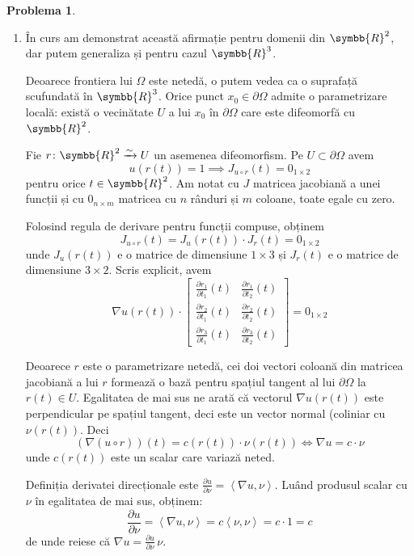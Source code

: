 \documentclass[a4paper, 12pt]{article}
\theoremstyle{definition}
\newtheorem{problem}{Problema}
\newcommand*{\reals}{\symbb{R}}
\newcommand*{\innerproduct}[2]{\left\langle #1, #2 \right\rangle}
\begin{document}
\begin{problem}
~
\begin{enumerate}[1).]
    \item În curs am demonstrat această afirmație pentru domenii din \(\reals^2\), dar putem generaliza și pentru cazul \(\reals^3\).

    Deoarece frontiera lui \(\Omega\) este netedă, o putem vedea ca o suprafață scufundată în \(\reals^3\). Orice punct \(x_0 \in \partial \Omega\) admite o parametrizare locală: există o vecinătate \(U\) a lui \(x_0\) în \(\partial \Omega\) care este difeomorfă cu \(\reals^2\).
    
    Fie \(r \colon \reals^{2} \xrightarrow{\sim} U\) un asemenea difeomorfism. Pe \(U \subset \partial \Omega\) avem
    \[
        u(r(t)) = 1 \implies J_{u \circ r} (t) = 0_{1 \times 2}
    \]
    pentru orice \(t \in \reals^2\). Am notat cu \(J\) matricea jacobiană a unei funcții și cu \(0_{n \times m}\) matricea cu \(n\) rânduri și \(m\) coloane, toate egale cu zero.
    
    Folosind regula de derivare pentru funcții compuse, obținem
    \[
         J_{u \circ r} (t) = J_{u} (r(t)) \cdot J_{r} (t) = 0_{1 \times 2}
    \]
    unde \(J_{u} (r(t))\) e o matrice de dimensiune \(1 \times 3\) și \(J_{r} (t)\) e o matrice de dimensiune \(3 \times 2\). Scris explicit, avem
    \[
        \nabla u(r(t))
        \cdot
        \begin{bmatrix}
            \frac{\partial r_1}{\partial t_1}(t) & \frac{\partial r_1}{\partial t_2}(t) \\[0.5em]
            \frac{\partial r_2}{\partial t_1}(t) & \frac{\partial r_2}{\partial t_2}(t) \\[0.5em]
            \frac{\partial r_3}{\partial t_1}(t) & \frac{\partial r_3}{\partial t_2}(t)
        \end{bmatrix} = 0_{1 \times 2}
    \]

    Deoarece \(r\) este o parametrizare netedă, cei doi vectori coloană din matricea jacobiană a lui \(r\) formează o bază pentru spațiul tangent al lui \(\partial \Omega\) la \(r(t) \in U\). Egalitatea de mai sus ne arată că vectorul \(\nabla u(r(t))\) este perpendicular pe spațiul tangent, deci este un vector normal (coliniar cu \(\nu(r(t))\). Deci
    \[
        \left(\nabla (u \circ r)\right) (t) = c(r(t)) \cdot \nu(r(t)) \iff \nabla u = c \cdot \nu
    \]
    unde \(c(r(t))\) este un scalar care variază neted.
    
    Definiția derivatei direcționale este \(\frac{\partial u}{\partial \nu} = \innerproduct{\nabla u}{\nu}\). Luând produsul scalar cu \(\nu\) în egalitatea de mai sus, obținem:
    \[
        \frac{\partial u}{\partial \nu} = \innerproduct{\nabla u}{\nu} = c \innerproduct{\nu}{\nu} = c \cdot 1 = c
    \]
    de unde reiese că \(\nabla u = \frac{\partial u}{\partial \nu} \, \nu\).


\end{enumerate}
\end{problem}
\end{document}
